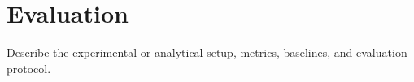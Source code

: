 \section{Evaluation}
\label{sec:evaluation}

Describe the experimental or analytical setup, metrics, baselines, and evaluation protocol.
